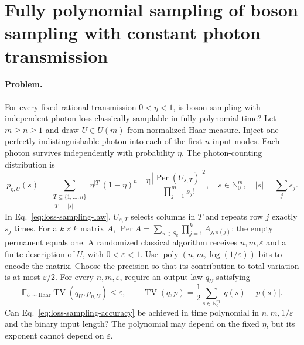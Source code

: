 \section{Fully polynomial sampling of boson sampling with constant photon transmission}
\label{sec:op_d436ff9fb9cb0ce5}

\paragraph{Problem.}
For every fixed rational transmission $0<\eta<1$, is boson sampling with independent photon loss classically samplable in fully polynomial time?
Let $m\geq n\geq1$ and draw $U\in U(m)$ from normalized Haar measure.
Inject one perfectly indistinguishable photon into each of the first $n$ input modes.
Each photon survives independently with probability $\eta$.
The photon-counting distribution is
\begin{equation}
 p_{\eta,U}(s)=
 \sum_{\substack{T\subseteq\{1,\ldots,n\}\\|T|=|s|}}
 \eta^{|T|}(1-\eta)^{n-|T|}
 \frac{|\operatorname{Per}(U_{s,T})|^2}{\prod_{j=1}^{m}s_j!},
 \quad s\in\mathbb N_0^m,\quad |s|=\sum_js_j.
 \label{eq:loss-sampling-law}
\end{equation}
In Eq.~\eqref{eq:loss-sampling-law}, $U_{s,T}$ selects columns in $T$ and repeats row $j$ exactly $s_j$ times.
For a $k\times k$ matrix $A$, $\operatorname{Per}A=\sum_{\pi\in S_k}\prod_{j=1}^kA_{j,\pi(j)}$; the empty permanent equals one.
A randomized classical algorithm receives $n,m,\varepsilon$ and a finite description of $U$, with $0<\varepsilon<1$.
Use $\operatorname{poly}(n,m,\log(1/\varepsilon))$ bits to encode the matrix.
Choose the precision so that its contribution to total variation is at most $\varepsilon/2$.
For every $n,m,\varepsilon$, require an output law $q_U$ satisfying
\begin{equation}
 \mathbb E_{U\sim\mathrm{Haar}}\operatorname{TV}(q_U,p_{\eta,U})\leq\varepsilon,
 \qquad
 \operatorname{TV}(q,p)=\frac12\sum_{s\in\mathbb N_0^m}|q(s)-p(s)|.
 \label{eq:loss-sampling-accuracy}
\end{equation}
Can Eq.~\eqref{eq:loss-sampling-accuracy} be achieved in time polynomial in $n,m,1/\varepsilon$ and the binary input length?
The polynomial may depend on the fixed $\eta$, but its exponent cannot depend on $\varepsilon$.

